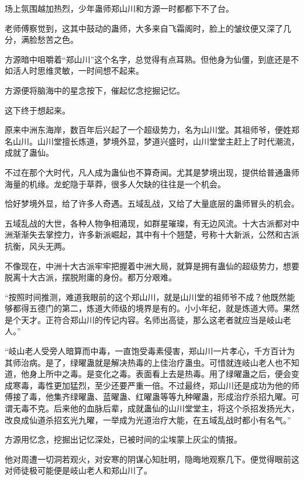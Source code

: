 
\begin{this_body}



场上氛围越加热烈，少年蛊师郑山川和方源一时都都下不了台。

老师傅察觉到，这其中鼓动的蛊师，大多来自飞霜阁时，脸上的皱纹便又深了几分，满脸愁苦之色。

方源暗中咀嚼着“郑山川”这个名字，总觉得有点耳熟。但他身为仙僵，到底还是不如活人时思维灵敏，一时间想不起来。

方源便将脑海中的星念按下，催起忆念挖掘记忆。

这下终于想起来。

原来中洲东海岸，数百年后兴起了一个超级势力，名为山川堂。其祖师爷，便姓郑名山川。山川堂擅长炼道，梦境外显，梦道兴盛时，山川堂堂主赶上了时代潮流，成就了蛊仙。

不过在那个大时代，凡人成为蛊仙也不算奇闻。尤其是梦境出现，提供给普通蛊师海量的机缘。龙蛇隐于草莽，很多人欠缺的往往是一个机会。

恰好梦境外显，给了许多人奇遇。五域乱战，又给了大量底层的蛊师冒头的机会。

五域乱战的大世，各种人物争相涌现，如群星璀璨，有无边风流。十大古派都对中洲渐渐失去掌控力，许多新派崛起，其中有十个翘楚，号称十大新派，公然和古派抗衡，风头无两。

不像现在，中洲十大古派牢牢把握着中洲大局，就算是拥有蛊仙的超级势力，想要脱离十大古派，摆脱附庸的身份。都万分艰难。

“按照时间推测，难道我眼前的这个郑山川，就是山川堂的祖师爷不成？他既然能够都得五德门的第二，炼道大师级的境界是有的。小小年纪，就是炼道大师。果然是个天才。正符合郑山川的传记内容。名师出高徒，那么这老者就应当是岐山老人。”

“岐山老人受旁人暗算而中毒，一直饱受毒素侵害，郑山川一片孝心，千方百计为其师治病。是了，绿曜蛊就是解决热毒的上佳治疗蛊虫。可惜就连岐山老人也不知道，他身上所中之毒。是变化之毒。表面看上去是热毒。用了绿曜蛊之后，便会变成寒毒，毒性更加猛烈，至少还要严重一倍。不过最终，郑山川还是成功为他的师傅接了毒，他集齐绿曜蛊、蓝曜蛊、红曜蛊等等九种曜蛊，形成治疗杀招九曜。可谓无毒不克。后来他的血脉后辈，成就蛊仙的山川堂堂主，将这个杀招发扬光大，改良成仙道杀招玄光九曜，一举成为光道治疗大能，在五域乱战时都小有名气。”

方源用忆念，挖掘出记忆深处，已被时间的尘埃蒙上灰尘的情报。

他对周遭一切洞若观火，对安寒的阴谋心知肚明，隐晦地观察几下。便觉得眼前这对师徒极可能便是岐山老人和郑山川了。


\end{this_body}
